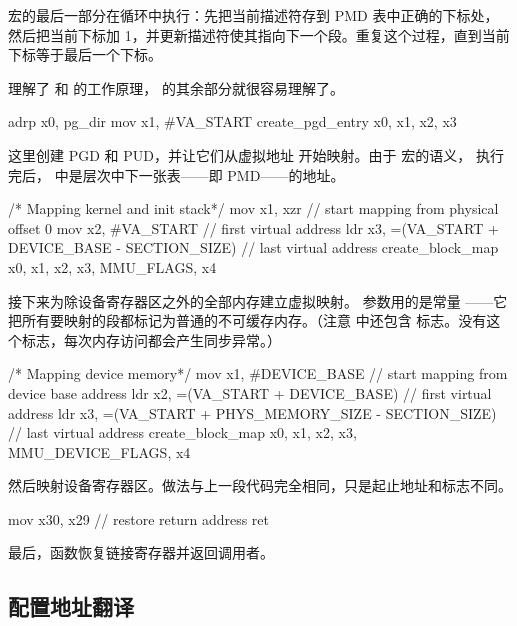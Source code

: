 宏的最后一部分在循环中执行：先把当前描述符存到 PMD 表中正确的下标处，然后把当前下标加 1，并更新描述符使其指向下一个段。重复这个过程，直到当前下标等于最后一个下标。

理解了  和  的工作原理， 的其余部分就很容易理解了。

\begin{asmcode}
	adrp	x0, pg_dir
	mov	x1, #VA_START
	create_pgd_entry x0, x1, x2, x3
\end{asmcode}

这里创建 PGD 和 PUD，并让它们从虚拟地址  开始映射。由于  宏的语义， 执行完后， 中是层次中下一张表——即 PMD——的地址。

\begin{asmcode}
	/* Mapping kernel and init stack*/
	mov 	x1, xzr							// start mapping from physical offset 0
	mov 	x2, #VA_START						// first virtual address
	ldr	x3, =(VA_START + DEVICE_BASE - SECTION_SIZE)		// last virtual address
	create_block_map x0, x1, x2, x3, MMU_FLAGS, x4
\end{asmcode}

接下来为除设备寄存器区之外的全部内存建立虚拟映射。 参数用的是常量 ——它把所有要映射的段都标记为普通的不可缓存内存。（注意  中还包含  标志。没有这个标志，每次内存访问都会产生同步异常。）

\begin{asmcode}
	/* Mapping device memory*/
	mov 	x1, #DEVICE_BASE					// start mapping from device base address
	ldr 	x2, =(VA_START + DEVICE_BASE)				// first virtual address
	ldr	x3, =(VA_START + PHYS_MEMORY_SIZE - SECTION_SIZE)	// last virtual address
	create_block_map x0, x1, x2, x3, MMU_DEVICE_FLAGS, x4
\end{asmcode}

然后映射设备寄存器区。做法与上一段代码完全相同，只是起止地址和标志不同。

\begin{asmcode}
	mov	x30, x29						// restore return address
	ret
\end{asmcode}

最后，函数恢复链接寄存器并返回调用者。

\subsection{配置地址翻译}

